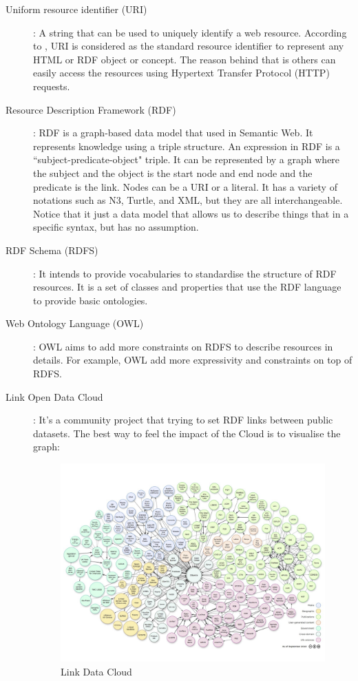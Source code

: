 \begin{description}

\item[Uniform resource identifier (URI)]: A string that can be used to uniquely identify a web resource. According to \cite{berners2006design}, URI is considered as the standard resource identifier to represent any HTML or RDF object or concept. The reason behind that is others can easily access the resources using Hypertext Transfer Protocol (HTTP) requests.

\item[Resource Description Framework (RDF)]: RDF is a graph-based data model that used in Semantic Web. It represents knowledge using a triple structure. An expression in RDF is a ``subject-predicate-object" triple. It can be represented by a graph where the subject and the object is the start node and end node and the predicate is the link. Nodes can be a URI or a literal.  It has a variety of notations such as N3, Turtle, and XML, but they are all interchangeable. Notice that it just a data model that allows us to describe things that in a specific syntax, but has no assumption.

\item[RDF Schema (RDFS)]: It intends to provide vocabularies to standardise the structure of RDF resources. It is a set of classes and properties that use the RDF language to provide basic ontologies. 

\item[Web Ontology Language (OWL)]: OWL aims to add more constraints on RDFS to describe resources in details. For example, OWL add more expressivity and constraints on top of RDFS.

\item[Link Open Data Cloud]: It's a community project that trying to set RDF links between public datasets. The best way to feel the impact of the Cloud is to visualise the graph:

\begin{figure}[ht!]
\centering
\includegraphics[width=150mm]{images/link-data-cloud.png}
\caption{Link Data Cloud}
\label{fig:LinkDataCloud}
\end{figure}
\end{description}

